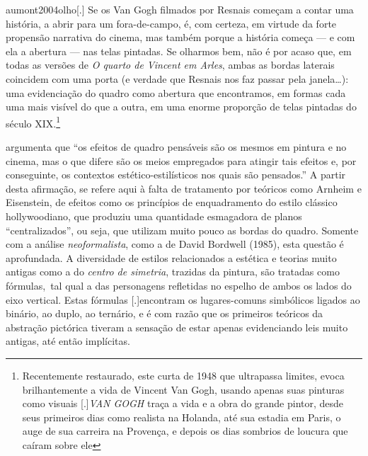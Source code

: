 \begin{displaycquote}[124]{aumont2004olho}[.]
	Se os Van Gogh filmados por Resnais começam a contar uma história, a
	abrir para um fora-de-campo, é, com certeza, em virtude da forte
	propensão narrativa do cinema, mas também porque a história começa --- e
	com ela a abertura --- nas telas pintadas. Se olharmos bem, não é por
	acaso que, em todas as versões de \emph{O quarto de Vincent em Arles},
	ambas as bordas laterais coincidem com uma porta (e verdade que Resnais
	nos faz passar pela janela\ldots): uma evidenciação do quadro como abertura
	que encontramos, em formas cada uma mais visível do que a outra, em uma
	enorme proporção de telas pintadas do século XIX\@.\footnote{Recentemente
		restaurado, este curta de 1948 que ultrapassa limites, evoca
		brilhantemente a vida de Vincent Van Gogh, usando apenas suas pinturas
		como visuais [.]{\emph{VAN GOGH} traça a vida e a obra do grande
			pintor, desde seus primeiros dias como realista na Holanda, até sua
			estadia em Paris, o auge de sua carreira na Provença, e depois os dias
			sombrios de loucura que caíram sobre ele}}
\end{displaycquote}

\textcite[124]{aumont2004olho} argumenta que \enquote{os efeitos de quadro pensáveis são
	os mesmos em pintura e no cinema, mas o que difere são os meios
	empregados para atingir tais efeitos e, por conseguinte, os contextos
	estético-estilísticos nos quais são pensados.}  A partir desta
afirmação, se refere aqui à falta de tratamento por teóricos como
Arnheim e Eisenstein, de efeitos como os princípios de enquadramento do
estilo clássico hollywoodiano, que produziu uma quantidade esmagadora
de planos \enquote{centralizados}, ou seja, que utilizam muito pouco as
bordas do quadro. Somente com a análise \emph{neoformalista}, como a de
David Bordwell (1985), esta questão é aprofundada. A diversidade de
estilos relacionados a estética e teorias muito antigas como a do
\emph{centro de simetria}, trazidas da pintura, são tratadas como
fórmulas,~tal qual a das personagens refletidas no espelho de ambos os
lados do eixo vertical. Estas fórmulas
[.]{encontram os lugares-comuns
	simbólicos ligados ao binário, ao duplo, ao ternário, e é com razão que
	os primeiros teóricos da abstração pictórica tiveram a sensação de
	estar apenas evidenciando leis muito antigas, até então implícitas}.%

